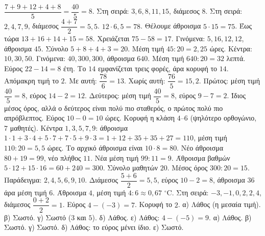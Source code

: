  $\dfrac{7+9+12+4+8}{5}=\dfrac{40}{5}=8$.
 Στη σειρά: $3,6,8,11,15$, διάμεσος $8$. Στη σειρά: $2,4,7,9$, διάμεσος $\dfrac{4+7}{2}=5{,}5$.
 $12\cdot6{,}5=78$.
 Θέλουμε άθροισμα $5\cdot15=75$. Έως τώρα $13+16+14+15=58$. Χρειάζεται $75-58=17$.
 Γινόμενα: $5,16,12,12$, άθροισμα $45$. Σύνολο $5+8+4+3=20$. Μέση τιμή $45:20=2{,}25$ ώρες.
 Κέντρα: $10,30,50$. Γινόμενα: $40,300,300$, άθροισμα $640$. Μέση τιμή $640:20=32$ λεπτά.
 Εύρος $22-14=8$ έτη. Το $14$ εμφανίζεται τρεις φορές, άρα κορυφή το $14$.
 Απόμακρη τιμή το $2$. Με αυτή: $\dfrac{78}{6}=13$. Χωρίς αυτή: $\dfrac{76}{5}=15{,}2$.
 Πρώτος: μέση τιμή $\dfrac{40}{5}=8$, εύρος $14-2=12$. Δεύτερος: μέση τιμή $\dfrac{40}{5}=8$, εύρος $9-7=2$. Ίδιος μέσος όρος, αλλά ο δεύτερος είναι πολύ πιο σταθερός, ο πρώτος πολύ πιο απρόβλεπτος.
 Εύρος $10-0=10$ ώρες. Κορυφή η κλάση $4$--$6$ (ψηλότερο ορθογώνιο, $7$ μαθητές). Κέντρα $1,3,5,7,9$: άθροισμα $1\cdot1+3\cdot4+5\cdot7+7\cdot5+9\cdot3=1+12+35+35+27=110$, μέση τιμή $110:20=5{,}5$ ώρες.
 Το αρχικό άθροισμα είναι $10\cdot8=80$. Νέο άθροισμα $80+19=99$, νέο πλήθος $11$. Νέα μέση τιμή $99:11=9$.
 Άθροισμα βαθμών $5\cdot12+15\cdot16=60+240=300$. Σύνολο μαθητών $20$. Μέσος όρος $300:20=15$.
 Παράδειγμα: $2,4,5,6,9,10$. Διάμεσος $\dfrac{5+6}{2}=5{,}5$, εύρος $10-2=8$, άθροισμα $36$ άρα μέση τιμή $6$.
 Άθροισμα $4$, μέση τιμή $4:6\approx0{,}67$ $^\circ$C. Στη σειρά: $-3,-1,0,2,2,4$, διάμεσος $\dfrac{0+2}{2}=1$. Εύρος $4-(-3)=7$. Κορυφή το $2$.
 α) Λάθος (η μεσαία τιμή). β) Σωστό. γ) Σωστό ($3$ και $5$). δ) Λάθος. ε) Λάθος: $4-(-5)=9$.
 α) Λάθος. β) Σωστό. γ) Σωστό. δ) Λάθος: το εύρος μένει ίδιο. ε) Σωστό.

